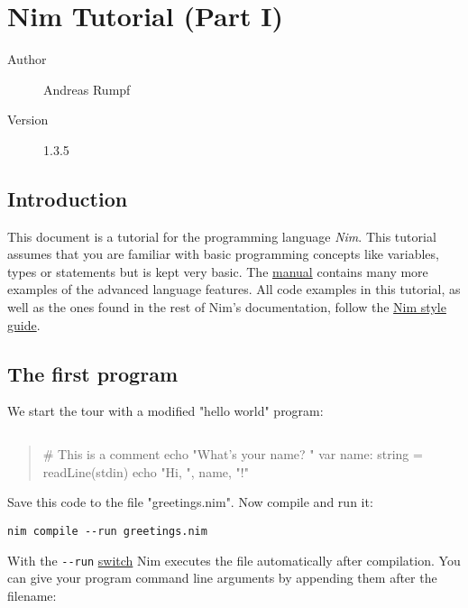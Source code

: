 \hypertarget{nim-tutorial-part-i}{%
\section{Nim Tutorial (Part I)}\label{nim-tutorial-part-i}}

\begin{description}
\item[Author]
Andreas Rumpf
\item[Version]
1.3.5
\end{description}

\hypertarget{introduction}{%
\subsection{Introduction}\label{introduction}}

This document is a tutorial for the programming language \emph{Nim}.
This tutorial assumes that you are familiar with basic programming
concepts like variables, types or statements but is kept very basic. The
\href{manual.html}{manual} contains many more examples of the advanced
language features. All code examples in this tutorial, as well as the
ones found in the rest of Nim's documentation, follow the
\href{nep1.html}{Nim style guide}.

\hypertarget{the-first-program}{%
\subsection{The first program}\label{the-first-program}}

We start the tour with a modified "hello world" program:

\begin{verbatim}
\end{verbatim}

\begin{quote}
\# This is a comment echo "What's your name? " var name: string =
readLine(stdin) echo "Hi, ", name, "!"
\end{quote}

Save this code to the file "greetings.nim". Now compile and run it:

\begin{verbatim}
nim compile --run greetings.nim
\end{verbatim}

With the \texttt{-\/-run}
\href{nimc.html\#compiler-usage-command-line-switches}{switch} Nim
executes the file automatically after compilation. You can give your
program command line arguments by appending them after the filename:


